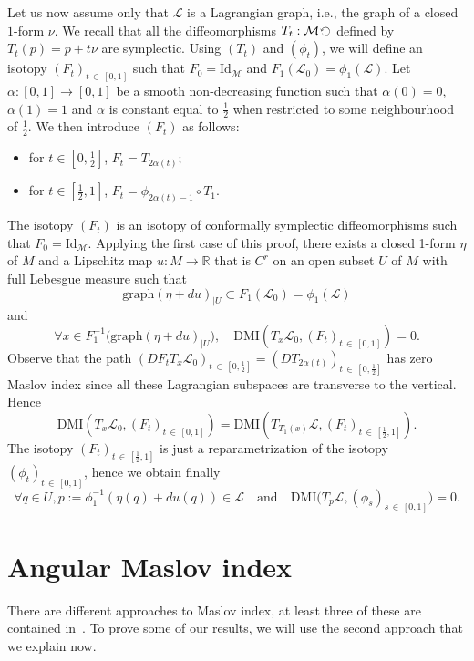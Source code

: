 \documentclass[AHL, Unicode, longabstracts, published]{cedram}
\newcommand*\M{\mathcal{M}}
\newcommand*\cl{\mathcal{L}}
\newcommand{\rId}{\mathrm{Id}}
\newcommand{\DMI}{\mathrm{DMI}}
\newcommand{\Graph}{\mathrm{graph}}
\newcommand*\R{\mathbb{R}}
\let\oldforall\forall
\renewcommand*{\forall}{\mathrel{\oldforall}}
\begin{document}
Let us now assume only that $\cl$ is a Lagrangian graph, i.e., the graph of a closed $1$-form $\nu$. We recall that all the diffeomorphisms $T_t:\M\,\rotatebox[origin=c]{90}{$\circlearrowleft$}\,$ defined by $T_t(p)=p+t\nu$ are symplectic.\newline
Using $(T_t)$ and $(\phi_t)$, we will define an isotopy $(F_t)_{t\,\in\,[0, 1]}$ such that $F_0=\rId_\M$ and $F_1(\cl_0)=\phi_1(\cl)$. Let $\alpha:[0, 1]\rightarrow [0,1]$ be a {smooth} non-decreasing function such that $\alpha(0)=0$, $\alpha(1)=1$ and $\alpha$ is constant equal to $\frac{1}{2}$ when restricted to some neighbourhood of $\frac{1}{2}$. We then introduce $(F_t)$ as follows:
\begin{itemize}
\item for $t\in [0, \frac{1}{2}]$, $F_t=T_{2\alpha({t})}$;
\item for $t\in [\frac{1}{2}, 1]$, $F_t=\phi_{2\alpha(t)-1}\circ T_1$.
\end{itemize}
The isotopy $(F_t)$ is an isotopy of conformally symplectic diffeomorphisms such that $F_0= \rId_{\M}$. Applying the first case of this proof, there exists a closed 1-form $\eta$ of $M$ and a Lipschitz map $u:M\rightarrow \R$ that is {$C^r$} on an open subset $U$ of $M$ with full Lebesgue measure such that
\[
\Graph(\eta+du)_{|U}\subset F_1(\cl_0)=\phi_1(\cl)
\]
and
\[
\forall x\in F_1^{-1}\big(\Graph(\eta+du)_{|U}\big),\quad \DMI\left(T_x\cl_0, (F_t)_{t\,\in\,[0, 1]}\right)=0.
\]
Observe that the path $(DF_tT_x\cl_0)_{t\,\in\,[0, \frac{1}{2}]}=(DT_{2\alpha(t)})_{t\,\in\,[0, \frac{1}{2}]}$ has zero Maslov index since all these Lagrangian subspaces are transverse to the vertical. Hence
\[
\DMI\left(T_x\cl_0, (F_t)_{t\,\in\,[0, 1]}\right)=\DMI\left({T_{T_1(x)}\cl}, (F_t)_{t\,\in\,[\frac{1}{2}, 1]}\right).
\]
The isotopy $(F_t)_{t\,\in\,[\frac{1}{2}, 1]}$ is just a reparametrization of the isotopy $(\phi_t)_{t\,\in\,[0, 1]}$, hence we obtain finally
\[
\forall q\in U, p:=\phi^{-1}_1(\eta(q)+du(q))\in \cl\quad\text{and}\quad \DMI\Big(T_{p}\cl,(\phi_s)_{s\,\in\,[0,1]}
\Big)=0.
\]



\section{Angular Maslov index}\label{angular MI}


There are different approaches to Maslov index, at least three of these are contained in~\cite{BargeGhys1992}. To prove some of our results, we will use the second approach that we explain now.
\end{document}
